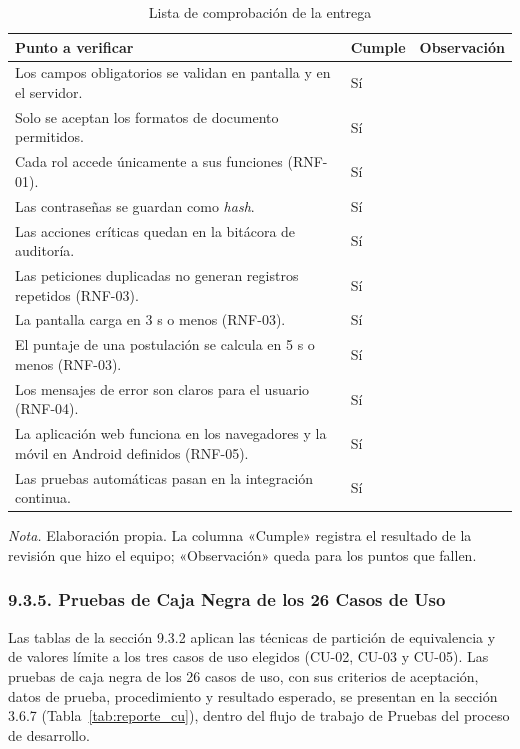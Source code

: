 \begin{table}[H]
\centering
\caption{Lista de comprobación de la entrega}
\label{tab:lista_comprobacion}
\small
\begin{tabular}{@{}p{9.4cm}p{2.0cm}p{2.0cm}@{}}
\toprule
\textbf{Punto a verificar} & \textbf{Cumple} & \textbf{Observación} \\
\midrule
Los campos obligatorios se validan en pantalla y en el servidor. & Sí & \\
Solo se aceptan los formatos de documento permitidos. & Sí & \\
Cada rol accede únicamente a sus funciones (RNF-01). & Sí & \\
Las contraseñas se guardan como \textit{hash}. & Sí & \\
Las acciones críticas quedan en la bitácora de auditoría. & Sí & \\
Las peticiones duplicadas no generan registros repetidos (RNF-03). & Sí & \\
La pantalla carga en 3 s o menos (RNF-03). & Sí & \\
El puntaje de una postulación se calcula en 5 s o menos (RNF-03). & Sí & \\
Los mensajes de error son claros para el usuario (RNF-04). & Sí & \\
La aplicación web funciona en los navegadores y la móvil en Android definidos (RNF-05). & Sí & \\
Las pruebas automáticas pasan en la integración continua. & Sí & \\
\bottomrule
\end{tabular}

\vspace{2pt}
\footnotesize\textit{Nota.} Elaboración propia. La columna «Cumple» registra el resultado de la revisión que hizo el equipo; «Observación» queda para los puntos que fallen.
\end{table}

\subsubsection{9.3.5. Pruebas de Caja Negra de los 26 Casos de Uso}

Las tablas de la sección 9.3.2 aplican las técnicas de partición de equivalencia y de valores límite a los tres casos de uso elegidos (CU-02, CU-03 y CU-05). Las pruebas de caja negra de los 26 casos de uso, con sus criterios de aceptación, datos de prueba, procedimiento y resultado esperado, se presentan en la sección 3.6.7 (Tabla~\ref{tab:reporte_cu}), dentro del flujo de trabajo de Pruebas del proceso de desarrollo.

